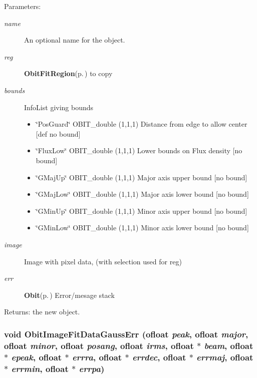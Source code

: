 \begin{Desc}
\item[Parameters:]
\begin{description}
\item[{\em name}]An optional name for the object. \item[{\em reg}]{\bf Obit\-Fit\-Region}{\rm (p.\,\pageref{structObitFitRegion})} to copy \item[{\em bounds}]Info\-List giving bounds \begin{itemize}
\item \char`\"{}Pos\-Guard\char`\"{} OBIT\_\-double (1,1,1) Distance from edge to allow center [def no bound] \item \char`\"{}Flux\-Low\char`\"{} OBIT\_\-double (1,1,1) Lower bounds on Flux density [no bound] \item \char`\"{}GMaj\-Up\char`\"{} OBIT\_\-double (1,1,1) Major axis upper bound [no bound] \item \char`\"{}GMaj\-Low\char`\"{} OBIT\_\-double (1,1,1) Major axis lower bound [no bound] \item \char`\"{}GMin\-Up\char`\"{} OBIT\_\-double (1,1,1) Minor axis upper bound [no bound] \item \char`\"{}GMin\-Low\char`\"{} OBIT\_\-double (1,1,1) Minor axis lower bound [no bound] \end{itemize}
\item[{\em image}]Image with pixel data, (with selection used for reg) \item[{\em err}]{\bf Obit}{\rm (p.\,\pageref{structObit})} Error/mesage stack \end{description}
\end{Desc}
\begin{Desc}
\item[Returns:]the new object. \end{Desc}
\subsubsection{\setlength{\rightskip}{0pt plus 5cm}void Obit\-Image\-Fit\-Data\-Gauss\-Err ({\bf ofloat} {\em peak}, {\bf ofloat} {\em major}, {\bf ofloat} {\em minor}, {\bf ofloat} {\em posang}, {\bf ofloat} {\em irms}, {\bf ofloat} $\ast$ {\em beam}, {\bf ofloat} $\ast$ {\em epeak}, {\bf ofloat} $\ast$ {\em errra}, {\bf ofloat} $\ast$ {\em errdec}, {\bf ofloat} $\ast$ {\em errmaj}, {\bf ofloat} $\ast$ {\em errmin}, {\bf ofloat} $\ast$ {\em errpa})}\label{ObitImageFitData_8h_a10}


